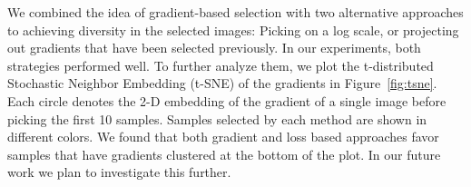 \documentclass[letterpaper, 10 pt, conference]{ieeeconf}  %
\begin{document}
%
%
%
We combined the idea of gradient-based selection with two alternative approaches to achieving diversity in the selected images: Picking on a log scale, or projecting out gradients that have been selected previously. In our experiments, both strategies performed well. To further analyze them, we plot the t-distributed Stochastic Neighbor Embedding (t-SNE) of the gradients in Figure~\ref{fig:tsne}. Each circle denotes the 2-D embedding of the gradient of a single image before picking the first 10 samples. Samples selected by each method are shown in different colors. We found that both gradient and loss based approaches favor samples that have gradients clustered at the bottom of the plot. In our future work we plan to investigate this further.





    

   
  
\end{document}
